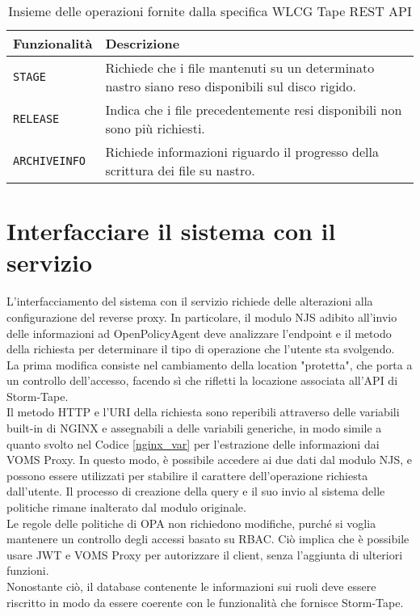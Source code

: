 \begin{table}
\begin{center}
\begin{tabular}{ | m{7em} | m{18em} | } 
  \hline
  \textbf{Funzionalità} & \textbf{Descrizione} \\ 
  \hline
  \texttt{STAGE} & Richiede che i file mantenuti su un determinato nastro siano reso disponibili sul disco rigido. \\ 
  \hline
  \texttt{RELEASE} & Indica che i file precedentemente resi disponibili non sono più richiesti. \\ 
  \hline
  \texttt{ARCHIVEINFO} & Richiede informazioni riguardo il progresso della scrittura dei file su nastro. \\ 
  \hline
\end{tabular}
\caption{\label{tab:table-name} Insieme delle operazioni fornite dalla specifica WLCG Tape REST API}
\end{center}
\end{table}

\section{Interfacciare il sistema con il servizio}
L'interfacciamento del sistema con il servizio richiede delle alterazioni alla configurazione del reverse proxy. In particolare, 
il modulo NJS adibito all'invio delle informazioni ad OpenPolicyAgent deve analizzare l'endpoint e il metodo della richiesta per 
determinare il tipo di operazione che l'utente sta svolgendo.
\\ La prima modifica consiste nel cambiamento della location "protetta", che porta a un controllo dell'accesso, 
facendo sì che rifletti la locazione associata all'API di Storm-Tape.  
\\ Il metodo HTTP e l'URI della richiesta sono reperibili attraverso delle variabili built-in di NGINX e assegnabili 
a delle variabili generiche, in modo simile a quanto svolto
nel Codice \ref*{nginx_var} per l'estrazione delle informazioni dai VOMS Proxy. In questo modo, è possibile accedere ai due dati dal modulo NJS,
 e possono essere utilizzati per stabilire il carattere dell'operazione richiesta dall'utente. Il processo di creazione della query e il suo invio al
  sistema delle politiche rimane inalterato dal modulo originale. 
\\ Le regole delle politiche di OPA non richiedono modifiche, purché si voglia mantenere un controllo degli accessi basato su RBAC. Ciò implica che è possibile usare JWT e VOMS Proxy 
per autorizzare il client, senza l'aggiunta di ulteriori funzioni. 
\\ Nonostante ciò, il database contenente le informazioni sui ruoli deve essere riscritto in modo da essere coerente con 
le funzionalità che fornisce Storm-Tape. 

